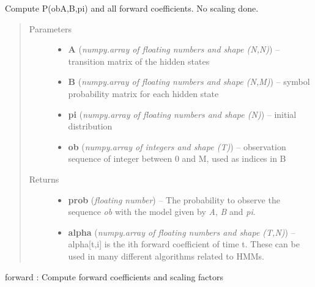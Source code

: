 \documentclass[letterpaper,10pt,english]{sphinxmanual}
\begin{document}

\begin{fulllineitems}
\label{hmm:kernel.python.forward_no_scaling}
Compute P(ob\textbar{}A,B,pi) and all forward coefficients. No scaling done.
\begin{quote}\begin{description}
\item[{Parameters}] \leavevmode\begin{itemize}
\item {} 
\textbf{A} (\emph{numpy.array of floating numbers and shape (N,N)}) --
transition matrix of the hidden states

\item {} 
\textbf{B} (\emph{numpy.array of floating numbers and shape (N,M)}) --
symbol probability matrix for each hidden state

\item {} 
\textbf{pi} (\emph{numpy.array of floating numbers and shape (N)}) --
initial distribution

\item {} 
\textbf{ob} (\emph{numpy.array of integers and shape (T)}) --
observation sequence of integer between 0 and M, used as indices in B

\end{itemize}

\item[{Returns}] \leavevmode
\begin{itemize}
\item {} 
\textbf{prob} (\emph{floating number}) --
The probability to observe the sequence \emph{ob} with the model given
by \emph{A}, \emph{B} and \emph{pi}.

\item {} 
\textbf{alpha} (\emph{numpy.array of floating numbers and shape (T,N)}) --
alpha{[}t,i{]} is the ith forward coefficient of time t. These can be
used in many different algorithms related to HMMs.

\end{itemize}


\end{description}\end{quote}




forward : Compute forward coefficients and scaling factors



\end{fulllineitems}
\end{document}
